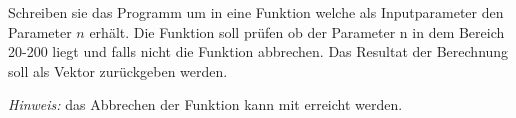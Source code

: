 \begin{aufg}[0]
Schreiben sie das Programm  um in eine Funktion welche als Inputparameter 
den Parameter $n$ erhält. Die Funktion soll prüfen ob der Parameter n in dem Bereich 20-200 liegt und
falls nicht die Funktion abbrechen. Das Resultat der Berechnung soll als Vektor zurückgeben werden.

\emph{Hinweis:} das Abbrechen der Funktion kann mit  erreicht werden.
\end{aufg}